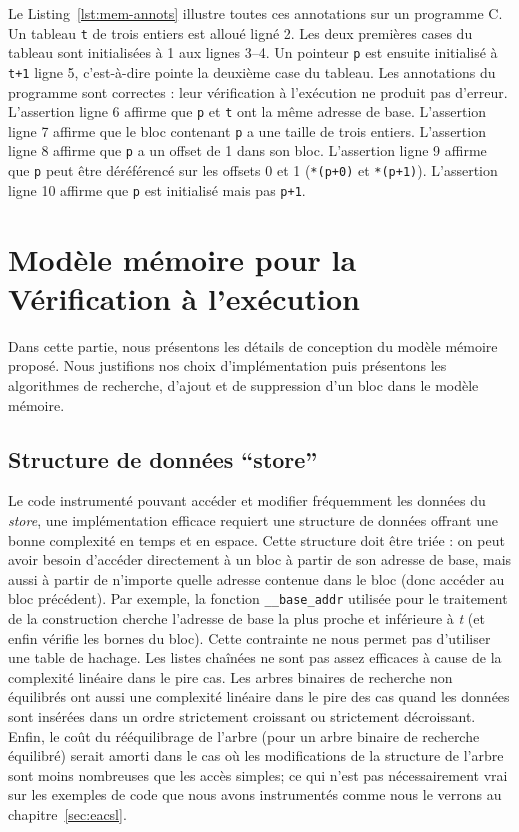 


Le Listing~\ref{lst:mem-annots} illustre toutes ces annotations sur un programme
C.
Un tableau \lstinline't' de trois entiers est alloué ligné 2.
Les deux premières cases du tableau sont initialisées à 1 aux lignes 3--4.
Un pointeur \lstinline'p' est ensuite initialisé à \lstinline't+1' ligne 5,
c'est-à-dire pointe la deuxième case du tableau.
Les annotations du programme sont correctes : leur vérification à l'exécution
ne produit pas d'erreur.
L'assertion ligne 6 affirme que \lstinline'p' et \lstinline't' ont la même
adresse de base.
L'assertion ligne 7 affirme que le bloc contenant \lstinline'p' a une taille de
trois entiers.
L'assertion ligne 8 affirme que \lstinline'p' a un offset de 1 dans son bloc.
L'assertion ligne 9 affirme que \lstinline'p' peut être déréférencé sur les
offsets 0 et 1 (\lstinline'*(p+0)' et \lstinline'*(p+1)').
L'assertion ligne 10 affirme que \lstinline'p' est initialisé mais pas
\lstinline'p+1'.


\section{Modèle mémoire pour la Vérification à l'exécution}
\label{sec:mem-model}


Dans cette partie, nous présentons les détails de conception du modèle mémoire
proposé.
Nous justifions nos choix d'implémentation puis présentons les algorithmes de
recherche, d'ajout et de suppression d'un bloc dans le modèle mémoire.


\subsection{Structure de données ``store''}

Le code instrumenté pouvant accéder et modifier fréquemment les données du
\textit{store}, une implémentation efficace requiert une structure de données
offrant une bonne complexité en temps et en espace.
Cette structure doit être triée : on peut avoir besoin d'accéder directement à
un bloc à partir de son adresse de base, mais aussi à partir de n'importe quelle
adresse contenue dans le bloc (donc accéder au bloc précédent).
Par exemple, la fonction \lstinline'__base_addr' utilisée pour le traitement
de la construction \baseaddrt cherche l'adresse de base la
plus proche et inférieure à \textit{t} (et enfin vérifie les bornes du bloc).
Cette contrainte ne nous permet pas d'utiliser une table de hachage.
Les listes chaînées ne sont pas assez efficaces à cause de la complexité
linéaire dans le pire cas.
Les arbres binaires de recherche non équilibrés ont aussi une complexité
linéaire dans le pire des cas quand les données sont insérées dans un ordre
strictement croissant ou strictement décroissant.
Enfin, le coût du rééquilibrage de l'arbre (pour un arbre binaire de recherche
équilibré) serait amorti dans le cas où les modifications de la structure de
l'arbre sont moins nombreuses que les accès simples; ce qui n'est pas
nécessairement vrai sur les exemples de code que nous avons instrumentés comme
nous le verrons au chapitre~\ref{sec:eacsl}.

